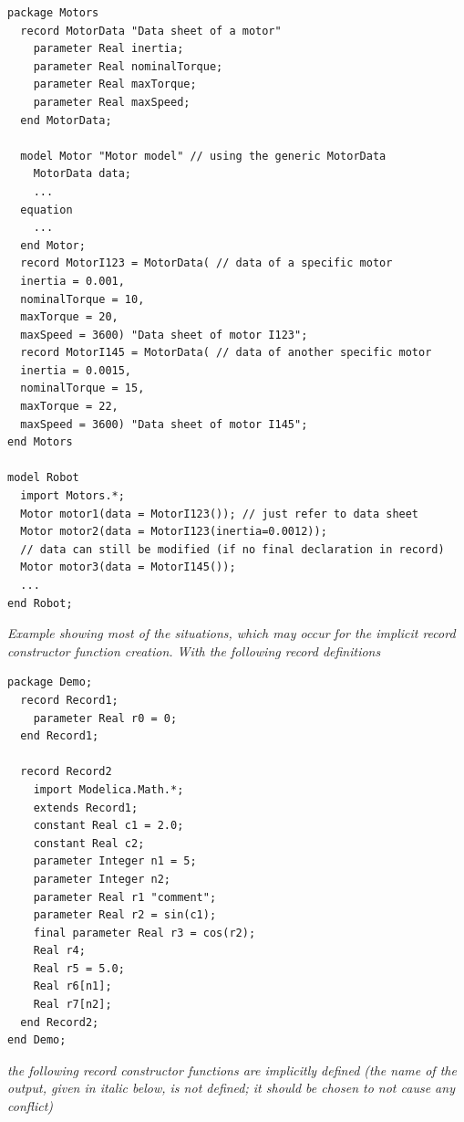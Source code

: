 \documentclass[10pt,a4paper]{report}
\begin{document}
\begin{lstlisting}[language=modelica]
package Motors
  record MotorData "Data sheet of a motor"
    parameter Real inertia;
    parameter Real nominalTorque;
    parameter Real maxTorque;
    parameter Real maxSpeed;
  end MotorData;

  model Motor "Motor model" // using the generic MotorData
    MotorData data;
    ...
  equation
    ...
  end Motor;
  record MotorI123 = MotorData( // data of a specific motor
  inertia = 0.001,
  nominalTorque = 10,
  maxTorque = 20,
  maxSpeed = 3600) "Data sheet of motor I123";
  record MotorI145 = MotorData( // data of another specific motor
  inertia = 0.0015,
  nominalTorque = 15,
  maxTorque = 22,
  maxSpeed = 3600) "Data sheet of motor I145";
end Motors

model Robot
  import Motors.*;
  Motor motor1(data = MotorI123()); // just refer to data sheet
  Motor motor2(data = MotorI123(inertia=0.0012));
  // data can still be modified (if no final declaration in record)
  Motor motor3(data = MotorI145());
  ...
end Robot;
\end{lstlisting}
\emph{Example showing most of the situations, which may occur for the
implicit record constructor function creation. With the following record
definitions}

\begin{lstlisting}[language=modelica]
package Demo;
  record Record1;
    parameter Real r0 = 0;
  end Record1;

  record Record2
    import Modelica.Math.*;
    extends Record1;
    constant Real c1 = 2.0;
    constant Real c2;
    parameter Integer n1 = 5;
    parameter Integer n2;
    parameter Real r1 "comment";
    parameter Real r2 = sin(c1);
    final parameter Real r3 = cos(r2);
    Real r4;
    Real r5 = 5.0;
    Real r6[n1];
    Real r7[n2];
  end Record2;
end Demo;
\end{lstlisting}
\emph{the following record constructor functions are implicitly defined
(the name of the output, given in italic below, is not defined; it
should be chosen to not cause any conflict)}
\end{document}
